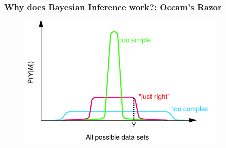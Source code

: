\documentclass[10pt]{beamer}
\begin{document}
  \begin{frame}[noframenumbering]
    \frametitle{Why does Bayesian Inference work?: Occam's Razor}

    \begin{figure}
      \centering
      \includegraphics[width=0.9\textwidth]{occamsRazor.png}
    \end{figure}
  \end{frame}
\end{document}
